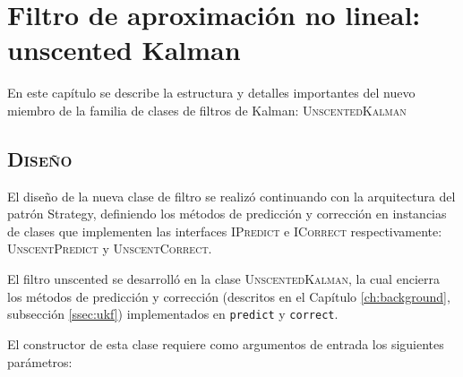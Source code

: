 \chapter{Filtro de aproximaci\'on no lineal: unscented Kalman}
\label{ch:news}
En este cap\'itulo se describe la estructura y detalles importantes del nuevo miembro de la familia de clases de filtros de Kalman: \textsc{UnscentedKalman}


\section{\textsc{Dise\~no}}
El dise\~no de la nueva clase de filtro se realiz\'o continuando con la arquitectura del patr\'on Strategy, definiendo los m\'etodos de predicci\'on y correcci\'on en instancias de clases que implementen las interfaces \textsc{IPredict} e \textsc{ICorrect} respectivamente: \textsc{UnscentPredict} y \textsc{UnscentCorrect}.
\bigskip

El filtro unscented se desarroll\'o en la clase \textsc{UnscentedKalman}, la cual encierra los m\'etodos de predicci\'on y correcci\'on (descritos en el Cap\'itulo \ref{ch:background}, subsecci\'on \ref{ssec:ukf}) implementados en \texttt{predict} y \texttt{correct}.
\bigskip

El constructor de esta clase requiere como argumentos de entrada los siguientes par\'ametros:

